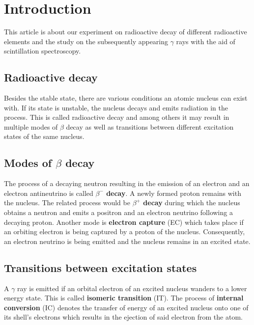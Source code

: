 \section{Introduction}
This article is about our experiment on radioactive decay of different radioactive elements and the study on the subsequently appearing $\gamma$ rays with the aid of scintillation spectroscopy.
%
\subsection{Radioactive decay}
Besides the stable state, there are various conditions an atomic nucleus can exist with.
If its state is unstable, the nucleus decays and emits radiation in the process.
This is called radioactive decay and among others it may result in multiple modes of $\beta$ decay as well as transitions between different excitation states of the same nucleus.
%
\subsection{Modes of $\beta$ decay}
The process of a decaying neutron resulting in the emission of an electron and an electron antineutrino is called \textbf{$\beta^{-}$ decay}.
A newly formed proton remains with the nucleus.
The related process would be \textbf{$\beta^{+}$ decay} during which the nucleus obtains a neutron and emits a positron and an electron neutrino following a decaying proton.
Another mode is \textbf{electron capture} (EC) which takes place if an orbiting electron is being captured by a proton of the nucleus. Consequently, an electron neutrino is being emitted and the nucleus remains in an excited state.
%
\subsection{Transitions between excitation states}
A $\gamma$ ray is emitted if an orbital electron of an excited nucleus wanders to a lower energy state.
This is called \textbf{isomeric transition} (IT).
The process of \textbf{internal conversion} (IC) denotes the transfer of energy of an excited nucleus onto one of its shell's electrons which results in the ejection of said electron from the atom.
%
